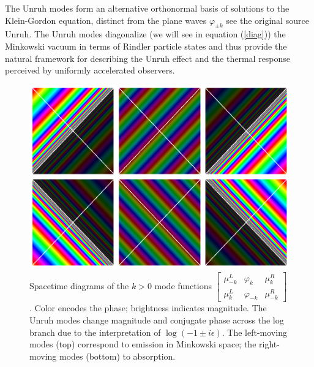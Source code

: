 \documentclass[12pt,a4paper]{article}
\begin{document}
The Unruh modes form an alternative orthonormal basis of solutions to the Klein-Gordon equation, distinct from the plane waves $\varphi_{\pm k}$ see the original source Unruh\cite{unruh1976notes}. The Unruh modes diagonalize (we will see in equation (\ref{diag})) the Minkowski vacuum in terms of Rindler particle states and thus provide the natural framework for describing the Unruh effect and the thermal response perceived by uniformly accelerated observers.

\begin{figure}[h]
\centering
\includegraphics[scale=0.5]{unruh_mode_rainbow.png}
\captionsetup{width=0.7\textwidth}
\caption{Spacetime diagrams of the $k>0$ mode functions $\left[\begin{array}{ccc} \mu^L_{-k} & \varphi_k & \mu^R_k \\ \mu^L_{k} & \varphi_{-k} & \mu^R_{-k} \end{array} \right]$. Color encodes the phase; brightness indicates magnitude. The Unruh modes change magnitude and conjugate phase across the log branch due to the interpretation of $\log(-1 \pm i\epsilon)$. The left-moving modes (top) correspond to emission in Minkowski space; the right-moving modes (bottom) to absorption.}
\label{unruh_rainbow}
\end{figure}
\end{document}
